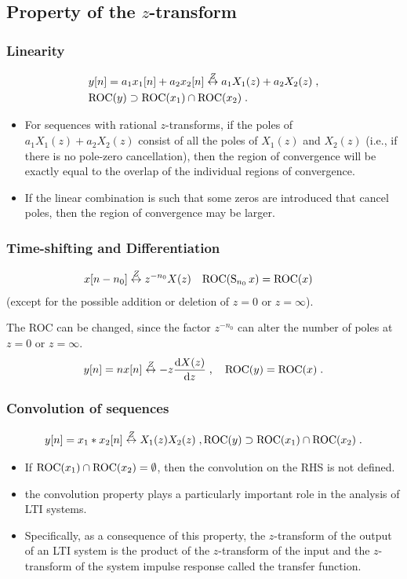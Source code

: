 \subsection{Property of the $z$-transform}
\begin{frame}
\frametitle{Linearity}
\begin{align*}
&y[n]= a_1 x_{1}[n]+ a_2 x_{2}[n]  \stackrel{Z}{\leftrightarrow} a_1 X_{1}(z)+a_2 X_{2}(z) \;,\\
&\mathrm{ROC}(y) \supset \mathrm{ROC}(x_{1}) \cap \mathrm{ROC}(x_2) \;.
\end{align*}
\begin{itemize}
\item For sequences with rational $z$-transforms, if the poles of $a_1X_{1}(z)+a_2X_{2}(z)$ consist of all the poles of $X_{1}(z)$ and $X_{2}(z)$ (i.e., if there is no pole-zero cancellation), then the region of convergence will be exactly equal to the overlap of the individual regions of convergence.
\item If the linear combination is such that some zeros are introduced that cancel poles, then the region of convergence may be larger.
\end{itemize}
\end{frame}

\begin{frame}
\frametitle{Time-shifting and Differentiation}
\begin{align*}
&x[n-n_{0}] \stackrel{Z}{\leftrightarrow} z^{-n_{0}}X(z) \quad \mathrm{ROC}(\operatorname{S}_{n_0} x)= \mathrm{ROC}(x)
\end{align*}
(except for the possible addition or deletion of $z=0$ or $ z=\infty$).

\bigskip

The ROC can be changed, since the factor $z^{-n_{0}}$ can alter the number of poles at $z=0$ or $ z=\infty$.
$$
y[n]= n x[n] \stackrel{Z}{\leftrightarrow} - z \frac{\mathrm{d} X(z)}{\mathrm{d} z} \;, \quad \mathrm{ROC}(y)= \mathrm{ROC}(x) \;.
$$
\end{frame}

\begin{frame}
\frametitle{Convolution of sequences}
$$
y[n]= x_1 * x_2[n] \stackrel{Z}{\leftrightarrow} X_1(z) X_2(z) \;, \mathrm{ROC}(y) \supset \mathrm{ROC}(x_1) \cap \mathrm{ROC}(x_2) \;.
$$
\begin{itemize}
\item If $\mathrm{ROC}(x_1) \cap \mathrm{ROC}(x_2) = \emptyset$, then the convolution on the RHS is not defined.
\item  the convolution property plays a particularly important role in the analysis of LTI systems.
\item Specifically, as a consequence of this property, the $z$-transform of the \alert{output} of an LTI system is the \alert{product} of the $z$-transform of the \alert{input} and the $z$-transform of the \alert{system impulse response} called the \alert{transfer function}.
\end{itemize}
\end{frame}

